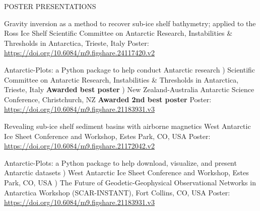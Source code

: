 \documentclass{ExpressiveResume}
\begin{document}
\vspace{-1em}
\noindent POSTER PRESENTATIONS \newline
\begin{cventries}

    {Gravity inversion as a method to recover sub-ice shelf bathymetry; applied to the Ross Ice Shelf}
    {Scientific Committee on Antarctic Research, Instabilities \&
        Thresholds in Antarctica, Trieste, Italy}
    {Poster: \url{https://doi.org/10.6084/m9.figshare.24117420.v2}}
    {}
    {}

    \talk{}
    {Antarctic-Plots: a Python package to help conduct Antarctic research}
    {) Scientific Committee on Antarctic Research, Instabilities \&
        Thresholds in Antarctica, Trieste, Italy
        \newline \hspace*{1em} \textbf{Awarded best poster}
    ) New Zealand-Australia Antarctic Science Conference, Christchurch, NZ
        \newline \hspace*{1em} \textbf{Awarded 2nd best poster}}
    {Poster: \url{https://doi.org/10.6084/m9.figshare.21183931.v3}}
    {}
    {}

    {Revealing sub-ice shelf sediment basins with airborne magnetics}
    {West Antarctic Ice Sheet Conference and Workshop, Estes Park, CO, USA}
    {Poster: \url{https://doi.org/10.6084/m9.figshare.21172042.v2}}
    {}
    {}

    \talk{} %
    {Antarctic-Plots: a Python package to help download, visualize, and present Antarctic datasets}
    {) West Antarctic Ice Sheet Conference and Workshop, Estes Park, CO, USA
        ) The Future of Geodetic-Geophysical Observational Networks in
        Antarctica Workshop (SCAR-INSTANT), Fort Collins, CO, USA
    }
    {Poster: \url{https://doi.org/10.6084/m9.figshare.21183931.v3}}
    {}
    {}



\end{cventries}
\end{document}
